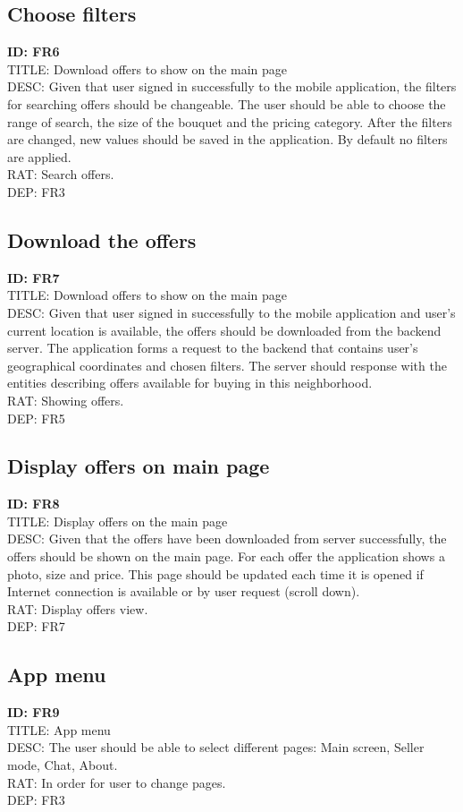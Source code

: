 \documentclass{scrreprt}
\begin{document}
\subsection{Choose filters}
\textbf{ID: FR6}\\
TITLE: Download offers to show on the main page\\
DESC: Given that user signed in successfully to the mobile application, the filters for searching offers should be changeable. The user should be able to choose the range of search, the size of the bouquet and the pricing category. After the filters are changed, new values should be saved in the application. By default no filters are applied.\\
RAT: Search offers.\\
DEP: FR3

\subsection{Download the offers}
\textbf{ID: FR7}\\
TITLE: Download offers to show on the main page\\
DESC: Given that user signed in successfully to the mobile application and user's current location is available, the offers should be downloaded from the backend server. The application forms a request to the backend that contains user's geographical coordinates and chosen filters. The server should response with the entities describing offers available for buying in this neighborhood.\\
RAT: Showing offers.\\
DEP: FR5

\subsection{Display offers on main page}
\textbf{ID: FR8}\\
TITLE: Display offers on the main page\\
DESC: Given that the offers have been downloaded from server successfully, the offers should be shown on the main page. For each offer the application shows a photo, size and price. This page should be updated each time it is opened if Internet connection is available or by user request (scroll down).\\
RAT: Display offers view.\\
DEP: FR7

\subsection{App menu}
\textbf{ID: FR9}\\
TITLE: App menu\\
DESC: The user should be able to select different pages: Main screen, Seller mode, Chat, About.\\
RAT: In order for user to change pages.\\
DEP: FR3
\end{document}
